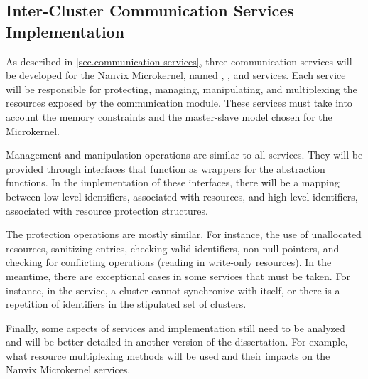 		\subsection*{Inter-Cluster Communication Services Implementation}


			As described in \autoref{sec.communication-services}, three communication
			services will be developed for the Nanvix Microkernel, named \sync, \mailbox,
			and \portal services.
			Each service will be responsible for protecting, managing, manipulating,
			and multiplexing the resources exposed by the \hal communication module.
			These services must take into account the memory constraints and the
			master-slave model chosen for the Microkernel.

			Management and manipulation operations are similar to all services.
			They will be provided through interfaces that function as wrappers
			for the \hal abstraction functions.
			In the implementation of these interfaces, there will be a mapping
			between low-level identifiers, associated with \hal resources,
			and high-level identifiers, associated with resource protection structures.


			The protection operations are mostly similar.
			For instance, the use of unallocated resources, sanitizing entries,
			checking valid identifiers, non-null pointers, and checking
			for conflicting operations (reading in write-only resources).
			In the meantime, there are exceptional cases in some services
			that must be taken.
			For instance, in the \sync service, a cluster cannot synchronize
			with itself, or there is a repetition of identifiers in the
			stipulated set of clusters.

			Finally, some aspects of services and implementation still need
			to be analyzed and will be better detailed in another version
			of the dissertation.
			For example, what resource multiplexing methods will be used
			and their impacts on the Nanvix Microkernel services.